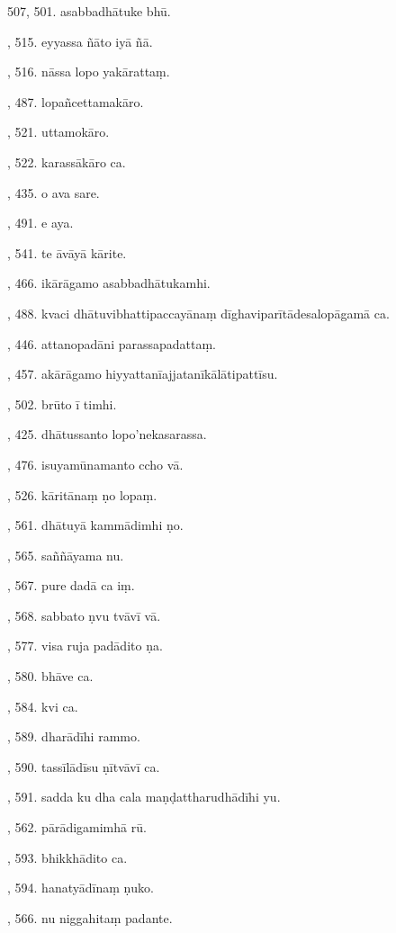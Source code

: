 507, 501. asabbadhātuke bhū.\par {}, 515. eyyassa ñāto iyā ñā.\par {}, 516. nāssa lopo yakārattaṃ.\par {}, 487. lopañcettamakāro.\par {}, 521. uttamokāro.\par {}, 522. karassākāro ca.\par {}, 435. o ava sare.\par {}, 491. e aya.\par {}, 541. te āvāyā kārite.\par {}, 466. ikārāgamo asabbadhātukamhi.\par {}, 488. kvaci dhātuvibhattipaccayānaṃ dīghaviparītādesalopāgamā ca.\par {}, 446. attanopadāni parassapadattaṃ.\par {}, 457. akārāgamo hiyyattanīajjatanīkālātipattīsu.\par {}, 502. brūto ī timhi.\par {}, 425. dhātussanto lopo’nekasarassa.\par {}, 476. isuyamūnamanto ccho vā.\par {}, 526. kāritānaṃ ṇo lopaṃ.\par {}, 561. dhātuyā kammādimhi ṇo.\par {}, 565. saññāyama nu.\par {}, 567. pure dadā ca iṃ.\par {}, 568. sabbato ṇvu tvāvī vā.\par {}, 577. visa ruja padādito ṇa.\par {}, 580. bhāve ca.\par {}, 584. kvi ca.\par {}, 589. dharādīhi rammo.\par {}, 590. tassīlādīsu ṇītvāvī ca.\par {}, 591. sadda ku dha cala maṇḍattharudhādīhi yu.\par {}, 562. pārādigamimhā rū.\par {}, 593. bhikkhādito ca.\par {}, 594. hanatyādīnaṃ ṇuko.\par {}, 566. nu niggahitaṃ padante.\par \noindent
